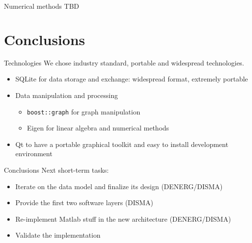 \documentclass[10pt,aspectratio=169]{beamer}
\begin{document}
\begin{frame}{Numerical methods}
TBD
\end{frame}

\section{Conclusions}

\begin{frame}{Technologies}
    We chose industry standard, portable and widespread technologies.
    \begin{itemize}
        \item SQLite for data storage and exchange: widespread format, extremely portable
        \item Data manipulation and processing
        \begin{itemize}
            \item \texttt{boost::graph} for graph manipulation
            \item Eigen for linear algebra and numerical methods
        \end{itemize}
        \item Qt to have a portable graphical toolkit and easy to install development environment
    \end{itemize}
\end{frame}

\begin{frame}{Conclusions}
    Next short-term tasks:
    \begin{itemize}
        \item Iterate on the data model and finalize its design (DENERG/DISMA)
        \item Provide the first two software layers (DISMA)
        \item Re-implement Matlab stuff in the new architecture (DENERG/DISMA)
        \item Validate the implementation
    \end{itemize}
\end{frame}
\end{document}
